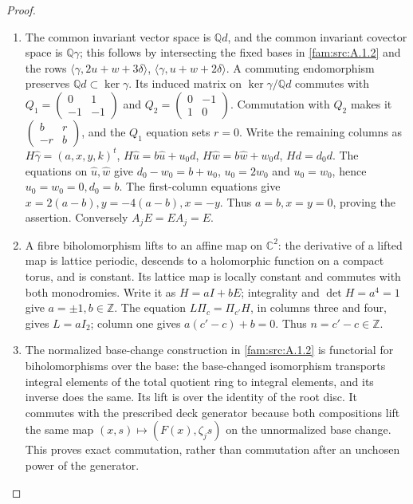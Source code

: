 \begin{proof}
\begin{enumerate}[label=\arabic*.,leftmargin=*]
\item The common invariant vector space is $\mathbb Qd$, and the common invariant covector space is $\mathbb Q\gamma$; this follows by intersecting the fixed bases in \ref{fam:src:A.1.2} and the rows $\langle\gamma,2u+w+3\delta\rangle$, $\langle\gamma,u+w+2\delta\rangle$. A commuting endomorphism preserves $\mathbb Qd\subset\ker\gamma$. Its induced matrix on $\ker\gamma/\mathbb Qd$ commutes with
$Q_1=\left(\begin{smallmatrix}0&1\\-1&-1\end{smallmatrix}\right)$ and $Q_2=\left(\begin{smallmatrix}0&-1\\1&0\end{smallmatrix}\right)$. Commutation with $Q_2$ makes it $\left(\begin{smallmatrix}b&r\\-r&b\end{smallmatrix}\right)$, and the $Q_1$ equation sets $r=0$. Write the remaining columns as
$H\widehat\gamma=(a,x,y,k)^t$, $H\widehat u=b\widehat u+u_0d$, $H\widehat w=b\widehat w+w_0d$, $Hd=d_0d$. The equations on $\widehat u,\widehat w$ give $d_0-w_0=b+u_0$, $u_0=2w_0$ and $u_0=w_0$, hence $u_0=w_0=0,d_0=b$. The first-column equations give $x=2(a-b),y=-4(a-b),x=-y$. Thus $a=b,x=y=0$, proving the assertion. Conversely $A_jE=EA_j=E$.

\item A fibre biholomorphism lifts to an affine map on $\mathbb C^2$: the derivative of a lifted map is lattice periodic, descends to a holomorphic function on a compact torus, and is constant. Its lattice map is locally constant and commutes with both monodromies. Write it as $H=aI+bE$; integrality and $\det H=a^4=1$ give $a=\pm1,b\in\mathbb Z$. The equation $L\Pi_c=\Pi_{c'}H$, in columns three and four, gives $L=aI_2$; column one gives $a(c'-c)+b=0$. Thus $n=c'-c\in\mathbb Z$.

\item The normalized base-change construction in \ref{fam:src:A.1.2} is functorial for biholomorphisms over the base: the base-changed isomorphism transports integral elements of the total quotient ring to integral elements, and its inverse does the same. Its lift is over the identity of the root disc. It commutes with the prescribed deck generator because both compositions lift the same map $(x,s)\mapsto(F(x),\zeta_js)$ on the unnormalized base change. This proves exact commutation, rather than commutation after an unchosen power of the generator.


\end{enumerate}
\end{proof}
